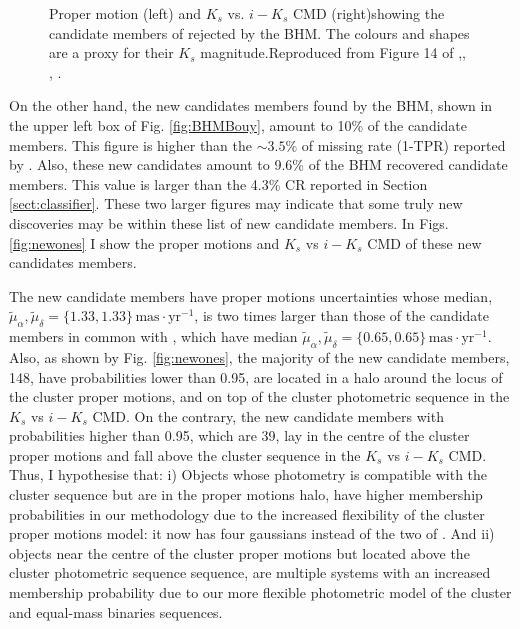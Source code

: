 \begin{figure}[htbp]
\begin{center}
\caption{Proper motion (left) and $K_s$ vs. $i-K_s$ CMD (right)showing the candidate members of \citet{Bouy2015} rejected by the BHM. The colours and shapes are a proxy for their $K_s$ magnitude.Reproduced from Figure 14 of \citet{Olivares2017},\textit{}, , .}
\label{fig:rejectedsCOLORS}
\end{center}
\end{figure}

On the other hand, the new candidates members found by the BHM, shown in the upper left box of Fig. \ref{fig:BHMBouy}, amount to 10\% of the \citet{Bouy2015} candidate members. This figure is higher than the $\sim 3.5\%$ of missing rate (1-TPR) reported by \citet{Sarro2014}. Also, these new candidates amount to 9.6\% of the BHM recovered candidate members. This value is larger than the 4.3\% CR reported in Section \ref{sect:classifier}. These two larger figures may indicate that some truly new discoveries may be within these list of new candidate members. In Figs. \ref{fig:newones} I show the proper motions and $K_s$ vs $i-K_s$ CMD of these new candidates members.

The new candidate members have proper motions uncertainties whose median, $\tilde{\mu}_{\alpha},\tilde{\mu}_{\delta}=\{1.33,1.33\} \,\mathrm{mas\cdot yr^{-1}}$, is two times larger than those of the candidate members in common with \citet{Bouy2015}, which have median $\tilde{\mu}_{\alpha},\tilde{\mu}_{\delta}=\{0.65,0.65\} \,\mathrm{mas\cdot yr^{-1}}$. Also, as shown by Fig. \ref{fig:newones}, the majority of the new candidate members, 148, have probabilities lower than 0.95, are located in a halo around the locus of the cluster proper motions, and on top of the cluster photometric sequence in the $K_s$ vs $i-K_s$ CMD. On the contrary, the new candidate members with probabilities higher than 0.95, which are 39, lay in the centre of the cluster proper motions and fall above the cluster sequence in the $K_s$ vs $i-K_s$ CMD. Thus, I hypothesise that: i) Objects whose photometry is compatible with the cluster sequence but are in the proper motions halo, have higher membership probabilities in our methodology due to the increased flexibility of the cluster proper motions model: it now has four gaussians instead of the two of \citet{Bouy2015}. And ii) objects near the centre of the cluster proper motions but located above the cluster photometric sequence sequence, are multiple systems \cite[probably triple systems which can amount to 4\% of the population][]{Duquennoy1991} with an increased membership probability due to our more flexible photometric model of the cluster and equal-mass binaries sequences.

